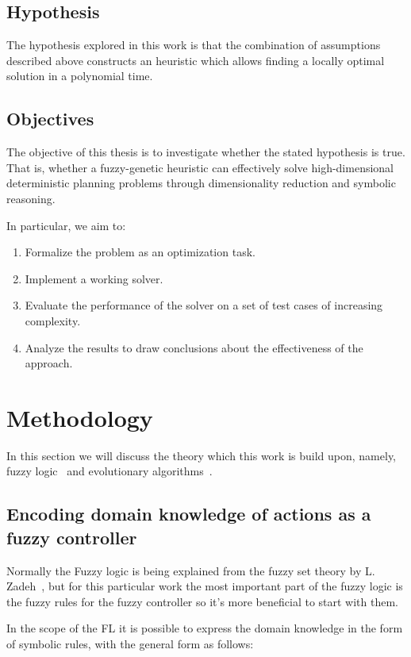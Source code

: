\documentclass[12pt, a4paper]{article}
\begin{document}
	\subsection{Hypothesis}
	The hypothesis explored in this work is that the combination of assumptions described above constructs an heuristic which allows finding a locally optimal solution in a polynomial time.
	
	\subsection{Objectives}
	The objective of this thesis is to investigate whether the stated hypothesis is true.
	That is, whether a fuzzy-genetic heuristic can effectively solve high-dimensional deterministic planning problems through dimensionality reduction and symbolic reasoning.
	
	In particular, we aim to:
	\begin{enumerate}
		\item Formalize the problem as an optimization task.
		\item Implement a working solver.
		\item Evaluate the performance of the solver on a set of test cases of increasing complexity.
		\item Analyze the results to draw conclusions about the effectiveness of the approach.
	\end{enumerate}

	\section{Methodology}\label{methodology}

  In this section we will discuss the theory which this work is build upon, namely, fuzzy logic~\cite{ray2014softcomputing} and evolutionary algorithms~\cite{mitchell1999geneticalgorithms}.

	\subsection{Encoding domain knowledge of actions as a fuzzy controller}

  Normally the Fuzzy logic is being explained from the fuzzy set theory by L. Zadeh~\cite{zadeh1965fuzzy}, but for this particular work the most important part of the fuzzy logic is the fuzzy rules for the fuzzy controller so it's more beneficial to start with them.

  In the scope of the FL it is possible to express the domain knowledge in the form of symbolic rules, with the general form as follows:
\end{document}
